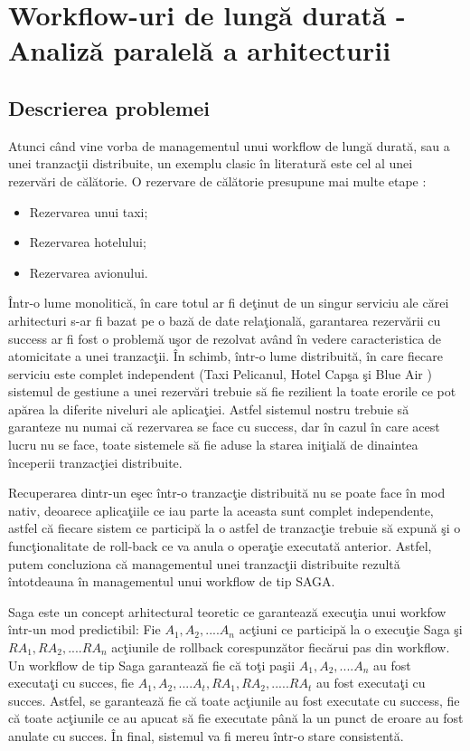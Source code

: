 \chapter{Workflow-uri de lungă durată - Analiză paralelă a arhitecturii}
\section{Descrierea problemei}
\quad Atunci când vine vorba de managementul unui workflow de lungă durată, sau a unei tranzacţii distribuite, un exemplu clasic în literatură este cel al unei rezervări de călătorie. O rezervare de călătorie presupune mai multe etape : 
\begin{itemize}
\item Rezervarea unui taxi;
\item Rezervarea hotelului;
\item Rezervarea avionului.
\end{itemize}
\par Într-o lume monolitică, în care totul ar fi deţinut de un singur serviciu ale cărei arhitecturi s-ar fi bazat pe o bază de date relaţională, garantarea rezervării cu success ar fi fost o problemă uşor de rezolvat având în vedere caracteristica de atomicitate a unei tranzacţii. În schimb, într-o lume distribuită, în care fiecare serviciu este complet independent (Taxi Pelicanul, Hotel Capşa şi Blue Air ) sistemul de gestiune a unei rezervări trebuie să fie rezilient la toate erorile ce pot apărea la diferite niveluri ale aplicaţiei. Astfel sistemul nostru trebuie să garanteze nu numai că rezervarea se face cu success, dar în cazul în care acest lucru nu se face, toate sistemele să fie aduse la starea iniţială de dinaintea începerii tranzacţiei distribuite.
\par Recuperarea dintr-un eşec într-o tranzacţie distribuită nu se poate face în mod nativ, deoarece aplicaţiile ce iau parte la aceasta sunt complet independente, astfel că fiecare sistem ce participă la o astfel de tranzacţie trebuie să expună şi o funcţionalitate de roll-back ce va anula o operaţie executată anterior. Astfel, putem concluziona că managementul unei tranzacţii distribuite rezultă întotdeauna în managementul unui workflow de tip SAGA. 
\par Saga este un concept arhitectural teoretic ce garantează execuţia unui workfow într-un mod predictibil: Fie \(A_{1}, A_{2}, .... A_{n}\) acţiuni ce participă la o execuţie Saga şi \(RA_{1}, RA_{2}, .... RA_{n}\) acţiunile de rollback corespunzător fiecărui pas din workflow. Un workflow de tip Saga garantează fie că toţi paşii \(A_{1}, A_{2}, .... A_{n}\) au fost executaţi cu succes, fie \(A_{1}, A_{2}, .... A_{t} , RA_{1}, RA_{2}, ..... RA_{t}\) au fost executaţi cu succes. Astfel, se garantează fie că toate acţiunile au fost executate cu success, fie că toate acţiunile ce au apucat să fie executate până la un punct de eroare au fost anulate cu succes. În final, sistemul va fi mereu într-o stare consistentă. 

